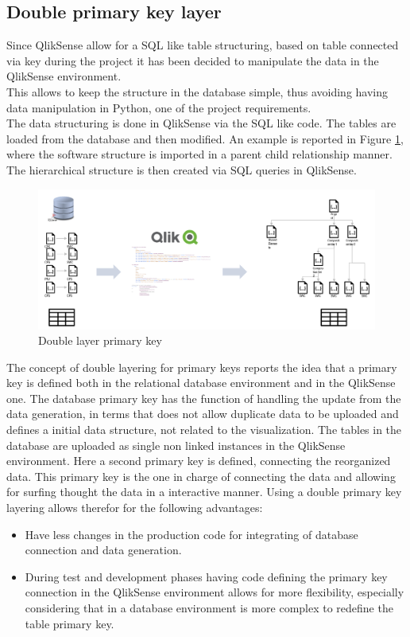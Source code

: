 \documentclass[../main.tex]{subfiles}
\begin{document}
\subsection{Double primary key layer}
Since QlikSense allow for a SQL like table structuring, based on table connected via key during the project it has been decided to manipulate the data in the QlikSense environment.\\
This allows to keep the structure in the database simple, thus avoiding having data manipulation in Python, one of the project requirements.\\
The data structuring is done in QlikSense via the SQL like code. The tables are loaded from the database and then modified. An example is reported in Figure \ref{fig:doublelayer}, where the software structure is imported in a  parent child relationship manner. The hierarchical structure is then created via SQL queries in QlikSense.  
\begin{figure}[H]
    \centering
    \includegraphics[width=\linewidth]{images_folder/doublalayer.png}
    \caption{Double layer primary key}
    \label{fig:doublelayer}
\end{figure} 
The concept of double layering for primary keys reports the idea that a primary key is defined both in the relational database environment and in the QlikSense one. The database primary key has the function of handling the update from the data generation, in terms that does not allow duplicate data to be uploaded and defines a initial data structure, not related to the visualization. The tables in the database are uploaded as single non linked instances in the QlikSense environment. Here a second primary key is defined, connecting the reorganized data. This primary key is the one in charge of connecting the data and allowing for surfing thought the data in a interactive manner. 
Using a double primary key layering allows therefor for the following advantages:
\begin{itemize}
\item Have less changes in the production code for integrating of database connection and data generation.
\item During test and development phases having code defining the primary key connection in the QlikSense environment allows for more flexibility, especially considering that in a database environment is more complex to redefine the table primary key. 
\end{itemize}
\end{document}
